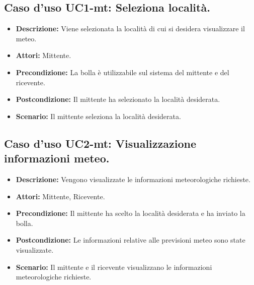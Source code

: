\subsection{Caso d'uso UC1-mt: Seleziona località.}
\begin{itemize}
\item[]\textbf{Descrizione:} Viene selezionata la località di cui si desidera visualizzare il meteo.
\item[]\textbf{Attori:} Mittente. 
\item[]\textbf{Precondizione:} La bolla è utilizzabile sul sistema del mittente e del ricevente. 
\item[]\textbf{Postcondizione:} Il mittente ha selezionato la località desiderata. 
\item[]\textbf{Scenario:}
Il mittente seleziona la località desiderata. 
\end{itemize}

\subsection{Caso d'uso UC2-mt: Visualizzazione informazioni meteo.}
\begin{itemize}
\item[]\textbf{Descrizione:} Vengono visualizzate le informazioni meteorologiche richieste.
\item[]\textbf{Attori:} Mittente, Ricevente. 
\item[]\textbf{Precondizione:} Il mittente ha scelto la località desiderata e ha inviato la bolla. 
\item[]\textbf{Postcondizione:} Le informazioni relative alle previsioni meteo sono state visualizzate. 
\item[]\textbf{Scenario:}
Il mittente e il ricevente visualizzano le informazioni meteorologiche richieste. 
\end{itemize}

\clearpage

